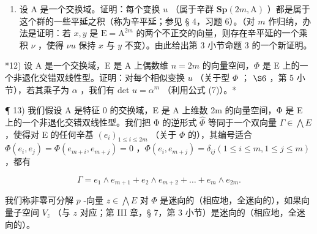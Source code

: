 \begin{enumerate}
\def\labelenumi{\arabic{enumi})}
\setcounter{enumi}{10}
\tightlist
\item
  设 A 是一个交换域。证明：每个变换 \(u\) （属于辛群 \(\mathbf{Sp}(2m, \mathrm{A})\) ）都是属于这个群的一些平延之积（称为辛平延；参见 § 4，习题 6）。（对 \(m\) 作归纳，办法是证明：若 \(x, y\) 是 \(\mathrm{E} = \mathrm{A}^{2m}\) 的两个不正交的向量，则存在辛平延的一个乘积 \(\nu\) ，使得 \(\nu u\) 保持 \(x\) 与 \(y\) 不变）。由此给出第 3 小节命题 3 的一个新证明。
\end{enumerate}

*12) 设 A 是一个交换域，E 是 A 上偶数维 \(n=2m\) 的向量空间，\(\Phi\) 是 E 上的一个非退化交错双线性型。证明：对每个相似变换 \(u\) （关于型 \(\Phi\) ； \(\S 6\) ，第 5 小节），若其乘子为 \(\alpha\) ，我们有 det \(u=\alpha^{m}\) （利用公式 (7)）。*

¶ 13) 我们假设 A 是特征 0 的交换域，E 是 A 上维数 2m 的向量空间，Φ 是 E 上的一个非退化交错双线性型。我们把 Φ 的逆形式 \(\widehat{\Phi}\) 等同于一个双向量 \(\Gamma\in\bigwedge E\) ，使得对 E 的任何辛基 \((e_{i})_{1\leqslant i\leqslant2m}\) （关于 \(\Phi\) 的），其编号适合 \(\Phi(e_{i},e_{j})=\Phi(e_{m+i},e_{m+j})=0\) ，\(\Phi(e_{i},e_{m+j})=\delta_{ij}(1\leqslant i\leqslant m,1\leqslant j\leqslant m)\) ，都有

\[
\Gamma = e _ {1} \wedge e _ {m + 1} + e _ {2} \wedge e _ {m + 2} + \dots + e _ {m} \wedge e _ {2 m}.
\]

我们称非零可分解 \(p\) -向量 \(z \in \bigwedge E\) 对 \(\Phi\) 是迷向的（相应地，全迷向的），如果向量子空间 \(V_z\) （与 \(z\) 对应；第 III 章，§ 7，第 3 小节）是迷向的（相应地，全迷向的）。


